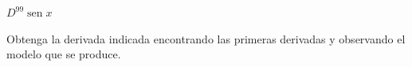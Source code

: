 \setcounter{enumi}{31}
\item $D^{99} \operatorname{sen} x$
\par
Obtenga la derivada indicada encontrando las primeras derivadas y observando el modelo que se produce.
